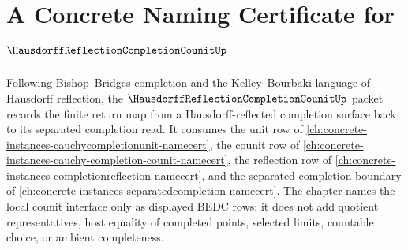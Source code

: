 \chapter{A Concrete Naming Certificate for $\HausdorffReflectionCompletionCounitUp$}
\label{ch:concrete-instances-hausdorff-reflection-completion-counit-namecert}

Following Bishop--Bridges completion and the Kelley--Bourbaki language of Hausdorff reflection, the $\HausdorffReflectionCompletionCounitUp$ packet records the finite return map from a Hausdorff-reflected completion surface back to its separated completion read. It consumes the unit row of \autoref{ch:concrete-instances-cauchycompletionunit-namecert}, the counit row of \autoref{ch:concrete-instances-cauchy-completion-counit-namecert}, the reflection row of \autoref{ch:concrete-instances-completionreflection-namecert}, and the separated-completion boundary of \autoref{ch:concrete-instances-separatedcompletion-namecert}. The chapter names the local counit interface only as displayed BEDC rows; it does not add quotient representatives, host equality of completed points, selected limits, countable choice, or ambient completeness.

